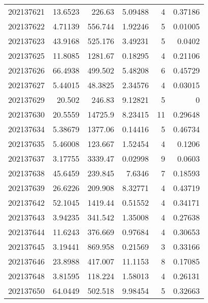 \begin{tabular}{rrrrrr}
 202137621 &         13.6523  &      226.63   &            5.09488 &           4 & 0.37186 \\
 202137622 &          4.71139 &      556.744  &            1.92246 &           5 & 0.01005 \\
 202137623 &         43.9168  &      525.176  &            3.49231 &           5 & 0.0402  \\
 202137625 &         11.8085  &     1281.67   &            0.18295 &           4 & 0.21106 \\
 202137626 &         66.4938  &      499.502  &            5.48208 &           6 & 0.45729 \\
 202137627 &          5.44015 &       48.3825 &            2.34576 &           4 & 0.03015 \\
 202137629 &         20.502   &      246.83   &            9.12821 &           5 & 0       \\
 202137630 &         20.5559  &    14725.9    &            8.23415 &          11 & 0.29648 \\
 202137634 &          5.38679 &     1377.06   &            0.14416 &           5 & 0.46734 \\
 202137635 &          5.46008 &      123.667  &            1.52454 &           4 & 0.1206  \\
 202137637 &          3.17755 &     3339.47   &            0.02998 &           9 & 0.0603  \\
 202137638 &         45.6459  &      239.845  &            7.6346  &           7 & 0.18593 \\
 202137639 &         26.6226  &      209.908  &            8.32771 &           4 & 0.43719 \\
 202137642 &         52.1045  &     1419.44   &            0.51552 &           4 & 0.34171 \\
 202137643 &          3.94235 &      341.542  &            1.35008 &           4 & 0.27638 \\
 202137644 &         11.6243  &      376.669  &            0.97684 &           4 & 0.30653 \\
 202137645 &          3.19441 &      869.958  &            0.21569 &           3 & 0.33166 \\
 202137646 &         23.8988  &      417.007  &           11.1153  &           8 & 0.17085 \\
 202137648 &          3.81595 &      118.224  &            1.58013 &           4 & 0.26131 \\
 202137650 &         64.0449  &      502.518  &            9.98454 &           5 & 0.32663 \\

\end{tabular}
